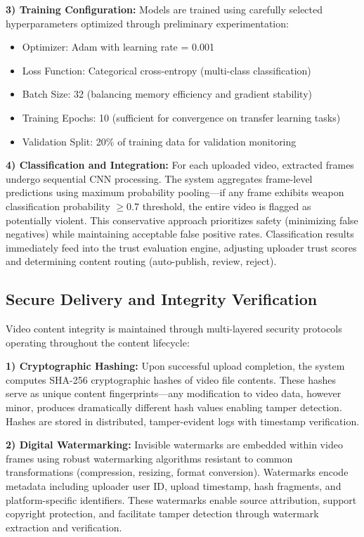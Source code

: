 \documentclass[conference]{IEEEtran}
\begin{document}
\textbf{3) Training Configuration:} Models are trained using carefully selected hyperparameters optimized through preliminary experimentation:

\begin{itemize}
\item Optimizer: Adam with learning rate = 0.001
\item Loss Function: Categorical cross-entropy (multi-class classification)
\item Batch Size: 32 (balancing memory efficiency and gradient stability)
\item Training Epochs: 10 (sufficient for convergence on transfer learning tasks)
\item Validation Split: 20\% of training data for validation monitoring
\end{itemize}

\textbf{4) Classification and Integration:} For each uploaded video, extracted frames undergo sequential CNN processing. The system aggregates frame-level predictions using maximum probability pooling—if any frame exhibits weapon classification probability $\geq$0.7 threshold, the entire video is flagged as potentially violent. This conservative approach prioritizes safety (minimizing false negatives) while maintaining acceptable false positive rates. Classification results immediately feed into the trust evaluation engine, adjusting uploader trust scores and determining content routing (auto-publish, review, reject).

\subsection{Secure Delivery and Integrity Verification}

Video content integrity is maintained through multi-layered security protocols operating throughout the content lifecycle:

\textbf{1) Cryptographic Hashing:} Upon successful upload completion, the system computes SHA-256 cryptographic hashes of video file contents. These hashes serve as unique content fingerprints—any modification to video data, however minor, produces dramatically different hash values enabling tamper detection. Hashes are stored in distributed, tamper-evident logs with timestamp verification.

\textbf{2) Digital Watermarking:} Invisible watermarks are embedded within video frames using robust watermarking algorithms resistant to common transformations (compression, resizing, format conversion). Watermarks encode metadata including uploader user ID, upload timestamp, hash fragments, and platform-specific identifiers. These watermarks enable source attribution, support copyright protection, and facilitate tamper detection through watermark extraction and verification.
\end{document}
